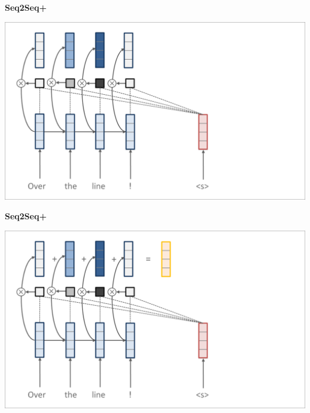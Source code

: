 \documentclass[aspectratio=169,12pt]{beamer}
\newcommand{\air}{\vspace{0.25cm}}
\begin{document}
\begin{frame}
  \begin{center}
    \textbf{Seq2Seq+} \air

  \end{center}
\center
\vspace{-5mm}
 \air
\includegraphics[scale=0.37]{nmt-attn4}
\end{frame}
\begin{frame}
  \begin{center}
    \textbf{Seq2Seq+} \air

  \end{center}
\center
\vspace{-5mm}
 \air
\includegraphics[scale=0.37]{nmt-attn5}
\end{frame}
\end{document}
